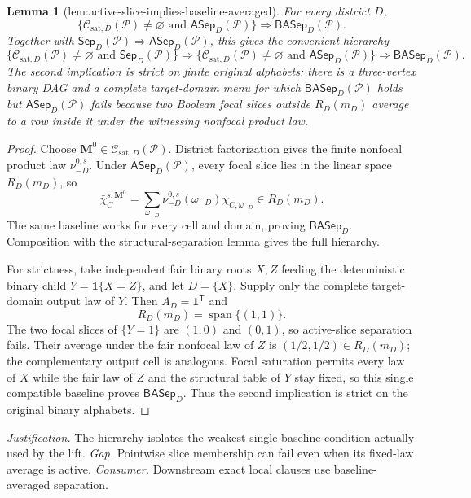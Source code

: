\documentclass{article}
\newtheorem{lemma}{Lemma}
\begin{document}
\begin{lemma}[lem:active-slice-implies-baseline-averaged]\label{lem:active-slice-implies-baseline-averaged}
For every district \(D\),
\[
\bigl\{\mathcal C_{\mathrm{sat},D}(\mathcal P)\ne\varnothing
\text{ and }\mathsf{ASep}_D(\mathcal P)\bigr\}
\Longrightarrow \mathsf{BASep}_D(\mathcal P).
\]
Together with \(\mathsf{Sep}_D(\mathcal P)\Longrightarrow\mathsf{ASep}_D(\mathcal P)\), this gives the convenient hierarchy
\[
\bigl\{\mathcal C_{\mathrm{sat},D}(\mathcal P)\ne\varnothing
\text{ and }\mathsf{Sep}_D(\mathcal P)\bigr\}
\Longrightarrow
\bigl\{\mathcal C_{\mathrm{sat},D}(\mathcal P)\ne\varnothing
\text{ and }\mathsf{ASep}_D(\mathcal P)\bigr\}
\Longrightarrow \mathsf{BASep}_D(\mathcal P).
\]
The second implication is strict on finite original alphabets: there is a three-vertex binary DAG and a complete target-domain menu for which \(\mathsf{BASep}_D(\mathcal P)\) holds but \(\mathsf{ASep}_D(\mathcal P)\) fails because two Boolean focal slices outside \(R_D(m_D)\) average to a row inside it under the witnessing nonfocal product law.
\end{lemma}
\begin{proof}
Choose \(\mathbf M^0\in\mathcal C_{\mathrm{sat},D}(\mathcal P)\).  District factorization gives the finite nonfocal product law \(\nu_{-D}^{0,s}\).  Under \(\mathsf{ASep}_D(\mathcal P)\), every focal slice lies in the linear space \(R_D(m_D)\), so
\[
\bar\chi_C^{s,\mathbf M^0}
=\sum_{\omega_{-D}}
\nu_{-D}^{0,s}(\omega_{-D})
\chi_{C,\omega_{-D}}
\in R_D(m_D).
\tag{1}
\]
The same baseline works for every cell and domain, proving \(\mathsf{BASep}_D\).  Composition with the structural-separation lemma gives the full hierarchy.

For strictness, take independent fair binary roots \(X,Z\) feeding the deterministic binary child \(Y=\mathbf 1\{X=Z\}\), and let \(D=\{X\}\).  Supply only the complete target-domain output law of \(Y\).  Then \(A_D=\mathbf 1^{\mathsf T}\) and
\[
R_D(m_D)=\operatorname{span}\{(1,1)\}.
\]
The two focal slices of \(\{Y=1\}\) are \((1,0)\) and \((0,1)\), so active-slice separation fails.  Their average under the fair nonfocal law of \(Z\) is \((1/2,1/2)\in R_D(m_D)\); the complementary output cell is analogous.  Focal saturation permits every law of \(X\) while the fair law of \(Z\) and the structural table of \(Y\) stay fixed, so this single compatible baseline proves \(\mathsf{BASep}_D\).  Thus the second implication is strict on the original binary alphabets.
\end{proof}
\par\smallskip\noindent \textit{Justification.} The hierarchy isolates the weakest single-baseline condition actually used by the lift. \textit{Gap.} Pointwise slice membership can fail even when its fixed-law average is active. \textit{Consumer.} Downstream exact local clauses use baseline-averaged separation.
\end{document}
